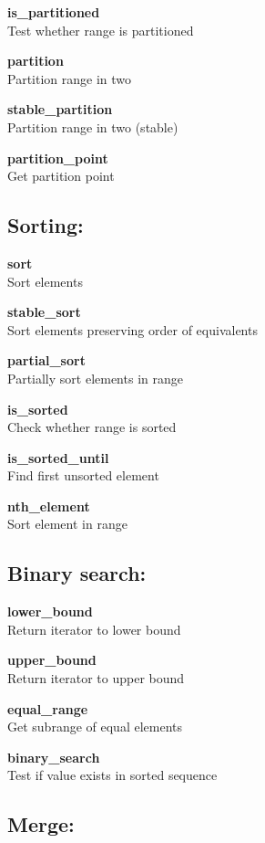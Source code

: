 \documentclass[table]{article}
\begin{document}
\begin{multicols}{2}
	\textbf{is\_partitioned}\\
	Test whether range is partitioned
	
	\textbf{partition}\\
	Partition range in two
	
	\textbf{stable\_partition}\\
	Partition range in two (stable)
	
	\textbf{partition\_point}\\
	Get partition point
	
	\subsection*{Sorting:}
	
	\textbf{sort}\\
	Sort elements
	
	\textbf{stable\_sort}\\
	Sort elements preserving order of equivalents
	
	\textbf{partial\_sort}\\
	Partially sort elements in range
	
	\textbf{is\_sorted}\\
	Check whether range is sorted
	
	\textbf{is\_sorted\_until}\\
	Find first unsorted element
	
	\textbf{nth\_element}\\
	Sort element in range
	
	\subsection*{Binary search:}
	
	\textbf{lower\_bound}\\
	Return iterator to lower bound
	
	\textbf{upper\_bound}\\
	Return iterator to upper bound
	
	\textbf{equal\_range}\\
	Get subrange of equal elements
	
	\textbf{binary\_search}\\
	Test if value exists in sorted sequence
	
	\subsection*{Merge:}
	

\end{multicols}
\end{document}
